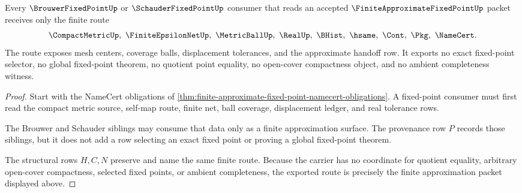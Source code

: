 \begin{theorem}
\label{thm:finite-approximate-fixed-point-brouwer-schauder-route}
Every $\BrouwerFixedPointUp$ or $\SchauderFixedPointUp$ consumer that reads an accepted $\FiniteApproximateFixedPointUp$ packet receives only the finite route
$$
\CompactMetricUp,\ \FiniteEpsilonNetUp,\ \MetricBallUp,\ \RealUp,\ \BHist,\ \hsame,\ \Cont,\ \Pkg,\ \NameCert .
$$
The route exposes mesh centers, coverage balls, displacement tolerances, and the approximate handoff row. It exports no exact fixed-point selector, no global fixed-point theorem, no quotient point equality, no open-cover compactness object, and no ambient completeness witness.
\end{theorem}
\begin{proof}
Start with the NameCert obligations of \autoref{thm:finite-approximate-fixed-point-namecert-obligations}. A fixed-point consumer must first read the compact metric source, self-map route, finite net, ball coverage, displacement ledger, and real tolerance rows.

The Brouwer and Schauder siblings may consume that data only as a finite approximation surface. The provenance row $P$ records those siblings, but it does not add a row selecting an exact fixed point or proving a global fixed-point theorem.

The structural rows $H,C,N$ preserve and name the same finite route. Because the carrier has no coordinate for quotient equality, arbitrary open-cover compactness, selected fixed points, or ambient completeness, the exported route is precisely the finite approximation packet displayed above.
\end{proof}


\begin{closurestatus}{\FiniteApproximateFixedPointUp}
  \theoryclosure{\seedClosure}
  \formalstatus{\unformalizedV}
\end{closurestatus}
